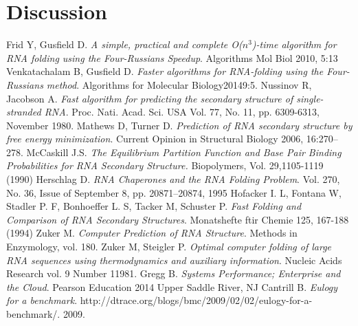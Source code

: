 \documentclass[12pt]{article}
\begin{document}
\section{Discussion}
\begin{thebibliography}{56}
Frid Y, Gusfield D.
\textit{A simple, practical and complete O($n^3$)-time
algorithm for RNA folding using the Four-Russians Speedup}.
Algorithms Mol Biol 2010, 5:13
Venkatachalam B, Gusfield D.
\textit{Faster algorithms for RNA-folding using the Four-Russians method}.
Algorithms for Molecular Biology20149:5.
Nussinov R, Jacobson A.
\textit{Fast algorithm for predicting the secondary structure of
single-stranded RNA}.
Proc. Nati. Acad. Sci. USA Vol. 77, No. 11, pp. 6309-6313, November 1980.
Mathews D, Turner D.
\textit{Prediction of RNA secondary structure by free energy
minimization}.
Current Opinion in Structural Biology 2006, 16:270–278.
McCaskill J.S.
\textit{The Equilibrium Partition Function and Base Pair
Binding Probabilities for RNA Secondary Structure.}
Biopolymers, Vol. 29,1105-1119 (1990)
Herschlag D.
\textit{RNA Chaperones and the RNA Folding Problem}.
Vol. 270, No. 36, Issue of September 8, pp. 20871–20874, 1995
Hofacker I. L, Fontana W, Stadler P. F, Bonhoeffer L. S, Tacker M, Schuster P.
\textit{Fast Folding and Comparison of RNA Secondary Structures}.
Monatshefte ftir Chemie 125, 167-188 (1994)
Zuker M.
\textit{Computer Prediction of RNA Structure}.
Methods in Enzymology, vol. 180.
Zuker M, Steigler P.
\textit{Optimal computer folding of large RNA sequences using thermodynamics and auxiliary information}.
Nucleic Acids Research vol. 9 Number 11981.
Gregg B.
\textit{Systems Performance; Enterprise and the Cloud}.
Pearson Education 2014 Upper Saddle River, NJ
Cantrill B.
\textit{Eulogy for a benchmark}.
http://dtrace.org/blogs/bmc/2009/02/02/eulogy-for-a-benchmark/.
2009.
\end{thebibliography}
\end{document}
